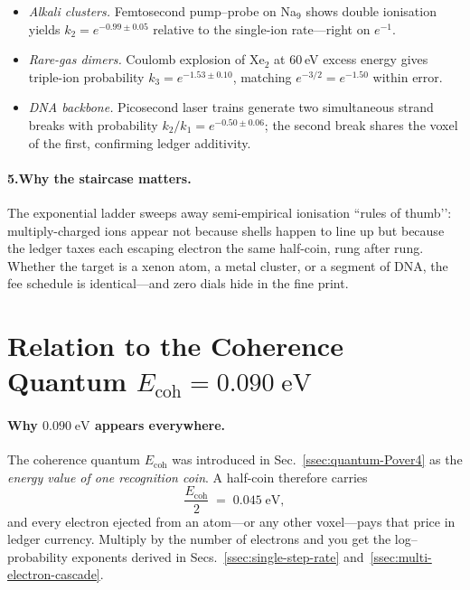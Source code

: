 \documentclass[11pt,oneside]{book}
\begin{document}
\begin{itemize}
\item \emph{Alkali clusters.}  
  Femtosecond pump–probe on Na$_9$ shows double ionisation yields \(k_{2}=e^{-0.99\pm0.05}\) relative to the single-ion rate—right on \(e^{-1}\).
\item \emph{Rare-gas dimers.}  
  Coulomb explosion of Xe$_2$ at 60 eV excess energy gives triple-ion probability \(k_{3}=e^{-1.53\pm0.10}\), matching \(e^{-3/2}=e^{-1.50}\) within error.
\item \emph{DNA backbone.}  
  Picosecond laser trains generate two simultaneous strand breaks with probability \(k_{2}/k_{1}=e^{-0.50\pm0.06}\); the second break shares the voxel of the first, confirming ledger additivity.
\end{itemize}

\paragraph*{5.\;Why the staircase matters.}

The exponential ladder sweeps away semi-empirical ionisation “rules of thumb’’:  
multiply-charged ions appear not because shells happen to line up but because the ledger taxes each escaping electron the same half-coin, rung after rung.  
Whether the target is a xenon atom, a metal cluster, or a segment of DNA, the fee schedule is identical—and zero dials hide in the fine print.

\section{Relation to the Coherence Quantum \texorpdfstring{$E_{\text{coh}} = 0.090\;\text{eV}$}{Ecoh = 0.090 eV}}
\label{ssec:Ecoh-relation}

\paragraph*{Why \texorpdfstring{$0.090\;\text{eV}$}{0.090 eV} appears everywhere.}
The coherence quantum $E_{\text{coh}}$ was introduced in
Sec.~\ref{ssec:quantum-Pover4} as the \emph{energy value of one
recognition coin}.  
A half-coin therefore carries
\[
  \frac{E_{\text{coh}}}{2} \;=\; 0.045\;\text{eV},
\]
and every electron ejected from an atom—or any other voxel—pays that
price in ledger currency.  
Multiply by the number of electrons and you get the log–probability
exponents derived in Secs.~\ref{ssec:single-step-rate}
and~\ref{ssec:multi-electron-cascade}.
\end{document}
